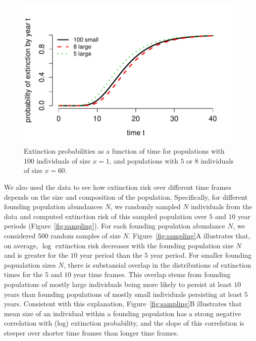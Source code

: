 \documentclass[12pt]{amsart}\usepackage[]{graphicx}\usepackage[]{color}
\makeatletter
\def\maxwidth{ %
  \ifdim\Gin@nat@width>\linewidth
    \linewidth
  \else
    \Gin@nat@width
  \fi
}
\newenvironment{knitrout}{}{} %
\makeatother
\begin{document}
\begin{knitrout}
\color{fgcolor}\begin{figure}
\includegraphics[width=\maxwidth]{figure/compare-1} \caption[Extinction probabilities as a function of time for populations with ]{Extinction probabilities as a function of time for populations with $100$ individuals of size $x=1$, and populations with $5$ or $8$ individuals of size $x=60$.}\label{fig:compare}
\end{figure}


\end{knitrout}

We also used the data to see how extinction risk over different time frames depends on the size and composition of the population. Specifically, for different founding population abundances $N$, we randomly sampled $N$ individuals from the data and computed extinction risk of this sampled population over $5$ and $10$ year periods (Figure~\ref{fig:sampling}). For each founding population abundance $N$, we considered $500$ random samples of size $N$. Figure~\ref{fig:sampling}A illustrates that, on average, $\log$ extinction risk decreases with the founding population size $N$ and is greater for the $10$ year period than the $5$ year period. For smaller founding popualation sizes $N$, there is substansial overlap in the distributions of extinction times for the $5$ and $10$ year time frames. This overlap stems from founding populations of mostly large individuals being more likely to persist at least $10$ years than founding populations of mostly small individuals persisting at least $5$ years. Consistent with this explanation, Figure~\ref{fig:sampling}B illustrates that mean size of an individual within a founding  population has a strong negative correlation with (log) extinction probability, and the slope of this correlation is steeper over shorter time frames than longer time frames.
\end{document}
